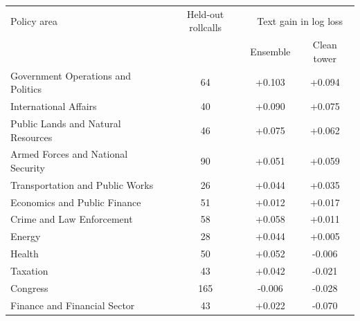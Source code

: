\begin{tabular}{lccc}
\toprule
Policy area & Held-out rollcalls & \multicolumn{2}{c}{Text gain in log loss} \\
 & & Ensemble & Clean tower \\
\midrule
Government Operations and Politics & 64 & +0.103 & +0.094 \\
International Affairs & 40 & +0.090 & +0.075 \\
Public Lands and Natural Resources & 46 & +0.075 & +0.062 \\
Armed Forces and National Security & 90 & +0.051 & +0.059 \\
Transportation and Public Works & 26 & +0.044 & +0.035 \\
Economics and Public Finance & 51 & +0.012 & +0.017 \\
Crime and Law Enforcement & 58 & +0.058 & +0.011 \\
Energy & 28 & +0.044 & +0.005 \\
Health & 50 & +0.052 & -0.006 \\
Taxation & 43 & +0.042 & -0.021 \\
Congress & 165 & -0.006 & -0.028 \\
Finance and Financial Sector & 43 & +0.022 & -0.070 \\
\bottomrule
\end{tabular}
